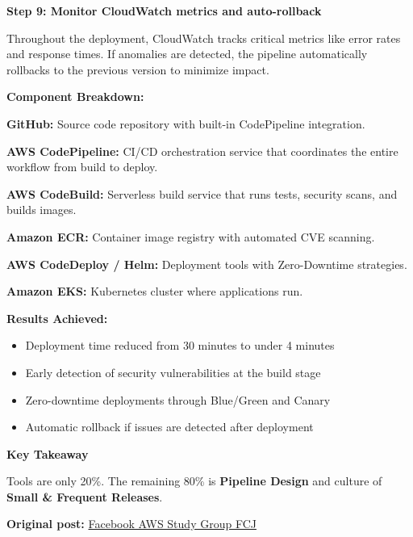 \textbf{Step 9: Monitor CloudWatch metrics and auto-rollback}

Throughout the deployment, CloudWatch tracks critical metrics like error
rates and response times. If anomalies are detected, the pipeline
automatically rollbacks to the previous version to minimize impact.

\vspace{0.5em}\noindent\textbf{Component Breakdown:}\par

\textbf{GitHub:} Source code repository with built-in CodePipeline
integration.

\textbf{AWS CodePipeline:} CI/CD orchestration service that coordinates
the entire workflow from build to deploy.

\textbf{AWS CodeBuild:} Serverless build service that runs tests,
security scans, and builds images.

\textbf{Amazon ECR:} Container image registry with automated CVE
scanning.

\textbf{AWS CodeDeploy / Helm:} Deployment tools with Zero-Downtime
strategies.

\textbf{Amazon EKS:} Kubernetes cluster where applications run.

\vspace{0.5em}\noindent\textbf{Results Achieved:}\par

\begin{itemize}
\tightlist
\item
  Deployment time reduced from 30 minutes to under 4 minutes
\item
  Early detection of security vulnerabilities at the build stage
\item
  Zero-downtime deployments through Blue/Green and Canary
\item
  Automatic rollback if issues are detected after deployment
\end{itemize}

\vspace{0.5em}\noindent\textbf{Key Takeaway}\par

Tools are only 20\%. The remaining 80\% is \textbf{Pipeline Design} and
culture of \textbf{Small \& Frequent Releases}.

\textbf{Original post:}
\href{https://www.facebook.com/groups/awsstudygroupfcj/permalink/2229176364513990/?rdid=aT7nNGRCmytCuj4K\#}{Facebook
AWS Study Group FCJ}
